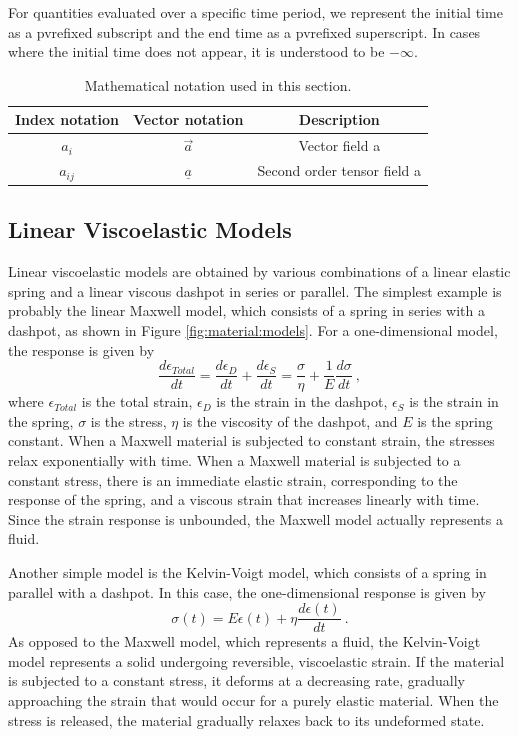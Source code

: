 For quantities evaluated over a specific time period, we represent
the initial time as a pvrefixed subscript and the end time as a pvrefixed
superscript. In cases where the initial time does not appear, it is
understood to be $-\infty$.

\noindent \begin{center}
\begin{table}[H]
\noindent \centering{}\caption{\label{tab:notation}Mathematical notation used in this
section.}
\begin{tabular}{|c|c|c|}
\hline 
Index notation & Vector notation & Description\tabularnewline
\hline 
\hline 
$a_{i}$ & $\overrightarrow{a}$ & Vector field a\tabularnewline
\hline 
$a_{ij}$ & $\underline{a}$ & Second order tensor field a\tabularnewline
\hline 
\end{tabular}
\end{table}

\par\end{center}


\subsection{Linear Viscoelastic Models}

Linear viscoelastic models are obtained by various combinations of
a linear elastic spring and a linear viscous dashpot in series or
parallel. The simplest example is probably the linear Maxwell model,
which consists of a spring in series with a dashpot, as shown in Figure
\vref{fig:material:models}. For a one-dimensional model, the response
is given by
\begin{equation}
\frac{d\epsilon_{Total}}{dt}=\frac{d\epsilon_{D}}{dt}+\frac{d\epsilon_{S}}{dt}=\frac{\sigma}{\eta}+\frac{1}{E}\frac{d\sigma}{dt}\:,
\end{equation}
where $\epsilon_{Total}$ is the total strain, $\epsilon_{D}$ is
the strain in the dashpot, $\epsilon_{S}$ is the strain in the spring,
$\sigma$ is the stress, $\eta$ is the viscosity of the dashpot,
and $E$ is the spring constant. When a Maxwell material is subjected
to constant strain, the stresses relax exponentially with time. When
a Maxwell material is subjected to a constant stress, there is an
immediate elastic strain, corresponding to the response of the spring,
and a viscous strain that increases linearly with time. Since the
strain response is unbounded, the Maxwell model actually represents
a fluid.

Another simple model is the Kelvin-Voigt model, which consists of
a spring in parallel with a dashpot. In this case, the one-dimensional
response is given by
\begin{equation}
\sigma\left(t\right)=E\epsilon\left(t\right)+\eta\frac{d\epsilon\left(t\right)}{dt}\:.
\end{equation}
As opposed to the Maxwell model, which represents a fluid, the Kelvin-Voigt
model represents a solid undergoing reversible, viscoelastic strain.
If the material is subjected to a constant stress, it deforms at a
decreasing rate, gradually approaching the strain that would occur
for a purely elastic material. When the stress is released, the material
gradually relaxes back to its undeformed state.

